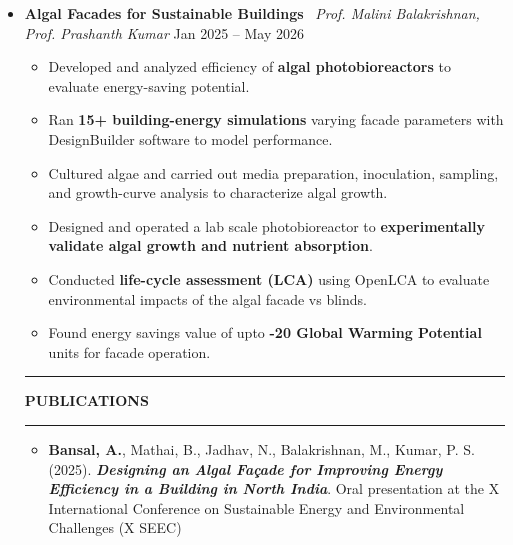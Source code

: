 \documentclass[letterpaper,9pt]{article}
\begin{document}
\begin{itemize}[leftmargin=0pt, parsep=0pt, itemsep=0.4em]
\vspace{0.35em}

\item[] \textbf{Algal Facades for Sustainable Buildings} \textbar\ \textit{Prof. Malini Balakrishnan, Prof. Prashanth Kumar} \hfill Jan 2025 -- May 2026
{\small
\begin{itemize}[leftmargin=1em, label=\textbullet, itemsep=0.5pt, parsep=0pt, topsep=1pt]
\item Developed and analyzed efficiency of \textbf{algal photobioreactors} to evaluate energy-saving potential.
\item Ran \textbf{15+ building-energy simulations} varying facade parameters with DesignBuilder software to model performance.
\item Cultured algae and carried out media preparation, inoculation, sampling, and growth-curve analysis to characterize algal growth.
\item Designed and operated a lab scale photobioreactor to \textbf{experimentally validate algal growth and nutrient absorption}.
\item Conducted \textbf{life-cycle assessment (LCA)} using OpenLCA to evaluate environmental impacts of the algal facade vs blinds.
\item Found energy savings value of upto \textbf{-20 Global Warming Potential} units for facade operation.
\end{itemize}
}

\noindent
\begin{center}
    \rule[0.5ex]{0.395\linewidth}{0.5pt}
    \hspace{0.5em}
    \textbf{PUBLICATIONS}
    \hspace{0.5em}
    \rule[0.5ex]{0.395\linewidth}{0.5pt}
\end{center}
\vspace{-0.2em}

\begin{itemize}[leftmargin=0pt, parsep=0pt, itemsep=0.2em]
\item[] \textbf{Bansal, A.}, Mathai, B., Jadhav, N., Balakrishnan, M., Kumar, P. S. (2025). \textbf{\textit{Designing an Algal Façade for Improving Energy Efficiency in a Building in North India}}. Oral presentation at the X International Conference on Sustainable Energy and Environmental Challenges (X SEEC)


\end{itemize}
\end{itemize}
\end{document}
